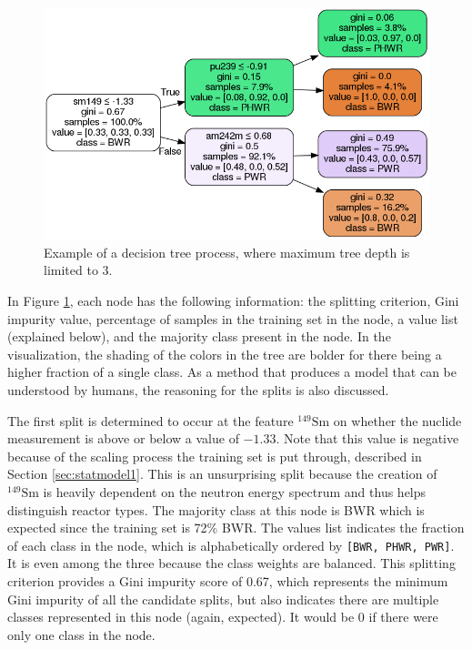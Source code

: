 \begin{figure}[!htb]
  \centering
  \includegraphics[width=\linewidth]{./chapters/litrev/dtree.png}
  \caption[Example of a decision tree]
          {Example of a decision tree process, where maximum tree depth is 
           limited to 3.}
  \label{fig:dtr}
\end{figure}

In Figure \ref{fig:dtr}, each node has the following information: the splitting
criterion, Gini impurity value, percentage of samples in the training set in
the node, a value list (explained below), and the majority class present in the
node.  In the visualization, the shading of the colors in the tree are bolder
for there being a higher fraction of a single class. As a method that produces
a model that can be understood by humans, the reasoning for the splits is also
discussed.

The first split is determined to occur at the feature ${}^{149}\text{Sm}$ on
whether the nuclide measurement is above or below a value of $-1.33$. Note that
this value is negative because of the scaling process the training set is put
through, described in Section \ref{sec:statmodel1}. This is an unsurprising
split because the creation of ${}^{149}\text{Sm}$ is heavily dependent on the
neutron energy spectrum and thus helps distinguish reactor types. The majority
class at this node is \gls{BWR} which is expected since the training set is
72\% \gls{BWR}.  The values list indicates the fraction of each class in the
node, which is alphabetically ordered by \texttt{[BWR, PHWR, PWR]}. It is even
among the three because the class weights are balanced.  This splitting
criterion provides a Gini impurity score of 0.67, which represents the minimum
Gini impurity of all the candidate splits, but also indicates there are
multiple classes represented in this node (again, expected).  It would be 0 if
there were only one class in the node.  

